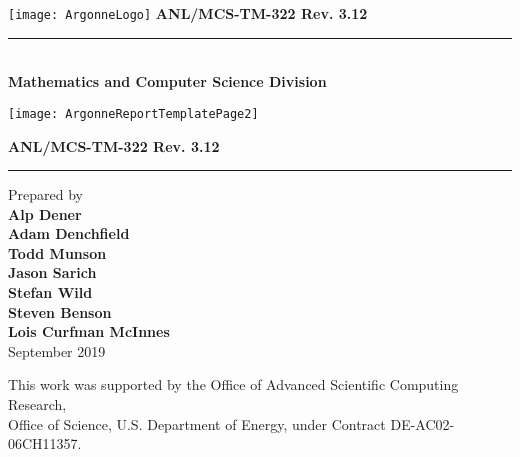 
\pagestyle{empty}
\hspace{-.65in}\texttt{[image: ArgonneLogo]}
\hfill  {\large {\bf ANL/MCS-TM-322 Rev. 3.12}}

\vspace*{2in}
\vspace*{8pt}
\hrule
\vspace*{8pt}

\vspace*{1in}
\noindent \\
{\Large {\bf Mathematics and Computer Science Division}}

\vspace*{10pt}


\vspace*{20pt}


\newpage
{}
\centerline{\texttt{[image: ArgonneReportTemplatePage2]}}
\newpage
\restoregeometry


\pagestyle{empty}
\hfill {\large {\bf ANL/MCS-TM-322 Rev. 3.12}}

\vspace*{2in}
\vspace*{8pt}
\hrule
\vspace*{8pt}

\vspace*{0.5in}
\noindent Prepared by \\
{\bf Alp Dener \\ Adam Denchfield \\ Todd Munson \\ Jason Sarich \\ Stefan Wild \\ Steven Benson \\ Lois Curfman McInnes}\\

\vspace*{30pt}
\noindent September 2019

\vspace*{20pt}
\noindent This work was supported by the Office of Advanced Scientific Computing Research, \\
Office of Science, U.S. Department of Energy, under Contract DE-AC02-06CH11357.
